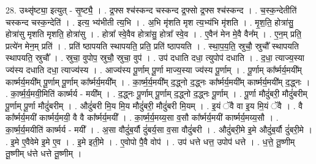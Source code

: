 \documentclass[17pt]{extarticle}
\begin{document}
28. उथ्सृ॑ष्ट्या॒ इत्युत् - सृ॒ष्ट्यै॒ । . द्र॒फ्स श्च॑स्कन्द चस्कन्द द्र॒फ्सो द्र॒फ्स श्च॑स्कन्द । . च॒स्क॒न्देतीति॑ चस्कन्द चस्क॒न्देति॑ । . इत्य॒ भ्य॑भीती त्य॒भि । . अ॒भि मृ॑शति मृश त्य॒भ्य॑भि मृ॑शति । . मृ॒श॒ति॒ होत्रा॑सु॒ होत्रा॑सु मृशति मृशति॒ होत्रा॑सु । . होत्रा᳚ स्वे॒वैव होत्रा॑सु॒ होत्रा᳚ स्वे॒व । . ए॒वैन॑ मेन मे॒वै वैन᳚म् । . ए॒न॒म् प्रति॒ प्रत्ये॑न मेन॒म् प्रति॑ । . प्रति॑ ष्ठापयति स्थापयति॒ प्रति॒ प्रति॑ ष्ठापयति । . स्था॒प॒य॒ति॒ स्रुचौ॒ स्रुचौ᳚ स्थापयति स्थापयति॒ स्रुचौ᳚ । . स्रुचा॒ वुपोप॒ स्रुचौ॒ स्रुचा॒ वुप॑ । . उप॑ दधाति दधा॒ त्युपोप॑ दधाति । . द॒धा॒ त्याज्य॒स्या ज्य॑स्य दधाति दधा॒ त्याज्य॑स्य । . आज्य॑स्य पू॒र्णाम् पू॒र्णा माज्य॒स्या ज्य॑स्य पू॒र्णाम् । . पू॒र्णाम् का᳚र्ष्मर्य॒मयी᳚म् कार्ष्मर्य॒मयी᳚म् पू॒र्णाम् पू॒र्णाम् का᳚र्ष्मर्य॒मयी᳚म् । . का॒र्ष्म॒र्य॒मयी᳚म् द॒द्ध्नो द॒द्ध्नः का᳚र्ष्मर्य॒मयी᳚म् कार्ष्मर्य॒मयी᳚म् द॒द्ध्नः । . का॒र्ष्म॒र्य॒मयी॒मिति॑ कार्ष्मर्य - मयी᳚म् । . द॒द्ध्नः पू॒र्णाम् पू॒र्णाम् द॒द्ध्नो द॒द्ध्नः पू॒र्णाम् । . पू॒र्णा मौदुं॑बरी॒ मौदुं॑बरीम् पू॒र्णाम् पू॒र्णा मौदुं॑बरीम् । . औदुं॑बरी मि॒य मि॒य मौदुं॑बरी॒ मौदुं॑बरी मि॒यम् । . इ॒यं ॅवै वा इ॒य मि॒यं ॅवै । . वै का᳚र्ष्मर्य॒मयी॑ कार्ष्मर्य॒मयी॒ वै वै का᳚र्ष्मर्य॒मयी᳚ । . का॒र्ष्म॒र्य॒मय्य॒सा व॒सौ का᳚र्ष्मर्य॒मयी॑ कार्ष्मर्य॒मय्य॒सौ । . का॒र्ष्म॒र्य॒मयीति॑ कार्ष्मर्य - मयी᳚ । . अ॒सा वौदुं॑ब॒र्यौ दुं॑बर्य॒सा व॒सा वौदुं॑बरी । . औदुं॑बरी॒मे इ॒मे औदुं॑ब॒र्यौ दुं॑बरी॒मे । . इ॒मे ए॒वैवेमे इ॒मे ए॒व । . इ॒मे इती॒मे । . ए॒वोपो पै॒वै वोप॑ । . उप॑ धत्ते धत्त॒ उपोप॑ धत्ते । . ध॒त्ते॒ तू॒ष्णीम् तू॒ष्णीम् ध॑त्ते धत्ते तू॒ष्णीम् । \newline
\end{document}
